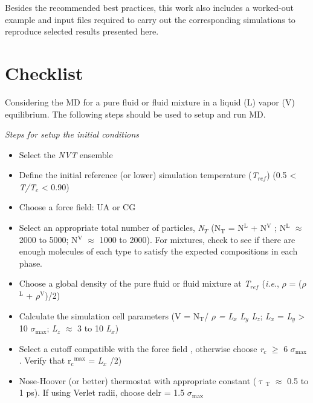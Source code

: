 \documentclass{scrbook}
\begin{document}
Besides the recommended best practices, this work also includes a worked-out
example and input files required to carry out the corresponding simulations to
reproduce selected results presented here.

\chapter{Checklist}

Considering the MD for a pure fluid or fluid mixture in a liquid (L) \textendash{} vapor (V) equilibrium. The following steps should be used to setup and run MD.

\textit{Steps for setup the initial conditions}
\begin{itemize}
\item Select the \textit{NVT} ensemble \\
\item Define the initial reference (or lower) simulation temperature (\textit{T}$_{ref}$) (0.5 {\textless} \textit{T/T}$_{c}$ {\textless} 0.90) \\
\item Choose a force field: UA or CG \\
\item Select an appropriate total number of particles, \textit{N}$_{T}$ (N$_{\mathrm{T}}$ = N$^{\mathrm{L}}$ + N$^{\mathrm{V}}$ ; N$^{\mathrm{L}}$ ${\approx}$ 2000 to 5000; N$^{\mathrm{V}}$ ${\approx}$ 1000 to 2000). For mixtures, check to see if there are enough molecules of each type to satisfy the expected compositions in each phase. \\
\item Choose a global density of the pure fluid or fluid mixture at \textit{T}$_{ref}$ (\textit{i.e}., {${\rho}$} = ({${\rho}$}$^{\mathrm{L}}$ + {${\rho}$}$^{\mathrm{V}}$)/2) \\
\item Calculate the simulation cell parameters (V = N$_{\mathrm{T}}$/ {${\rho}$} \textit{= L}$_{x}$ \textit{L}$_{y}$ \textit{L}$_{z}$; \textit{L}$_{x}$ = \textit{L}$_{y}$ {\textgreater} 10 ${\sigma}$$_{\mathrm{max}}$;  \textit{L}$_{z}$ ${\approx}$ 3 to 10 \textit{L}$_{x}$)  \\
\item Select a cutoff compatible with the force field , otherwise choose \textit{r}$_{c}$ ${\geq}$ 6 ${\sigma}$$_{\mathrm{max}}$ . Verify that r$_{\mathrm{c}}$$^{\mathrm{max}}$ = \textit{L}$_{x}$ /2) \\
\item Nose-Hoover (or better) thermostat with appropriate constant (${\uptau}$$_{\mathrm{T}}$ ${\approx}$ 0.5 to 1 ps). If using Verlet radii, choose delr = 1.5 ${\sigma}$$_{\mathrm{max}}$ \\
$$
\end{itemize}
\end{document}
